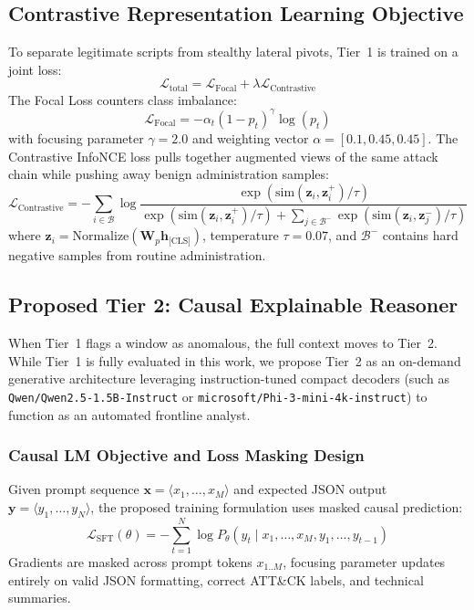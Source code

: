 \documentclass[10pt,journal,compsoc]{IEEEtran}
\begin{document}
\subsection{Contrastive Representation Learning Objective}
To separate legitimate scripts from stealthy lateral pivots, Tier~1 is trained on a joint loss:
\begin{equation}
\mathcal{L}_{\text{total}} = \mathcal{L}_{\text{Focal}} + \lambda \mathcal{L}_{\text{Contrastive}}
\end{equation}
The Focal Loss counters class imbalance:
\begin{equation}
\mathcal{L}_{\text{Focal}} = -\alpha_t (1 - p_t)^\gamma \log(p_t)
\end{equation}
with focusing parameter $\gamma = 2.0$ and weighting vector $\alpha = [0.1, 0.45, 0.45]$. The Contrastive InfoNCE loss pulls together augmented views of the same attack chain while pushing away benign administration samples:
\begin{equation}
\mathcal{L}_{\text{Contrastive}} = -\sum_{i \in \mathcal{B}} \log \frac{\exp\left(\text{sim}(\mathbf{z}_i, \mathbf{z}_i^+) / \tau\right)}{\exp\left(\text{sim}(\mathbf{z}_i, \mathbf{z}_i^+) / \tau\right) + \sum_{j \in \mathcal{B}^-} \exp\left(\text{sim}(\mathbf{z}_i, \mathbf{z}_j^-) / \tau\right)}
\end{equation}
where $\mathbf{z}_i = \text{Normalize}(\mathbf{W}_p \mathbf{h}_{\text{[CLS]}})$, temperature $\tau = 0.07$, and $\mathcal{B}^-$ contains hard negative samples from routine administration.

\subsection{Proposed Tier 2: Causal Explainable Reasoner}
When Tier~1 flags a window as anomalous, the full context moves to Tier~2. While Tier~1 is fully evaluated in this work, we propose Tier~2 as an on-demand generative architecture leveraging instruction-tuned compact decoders (such as \texttt{Qwen/Qwen2.5-1.5B-Instruct} or \texttt{microsoft/Phi-3-mini-4k-instruct}) to function as an automated frontline analyst.

\subsubsection{Causal LM Objective and Loss Masking Design}
Given prompt sequence $\mathbf{x} = \langle x_1, \dots, x_M \rangle$ and expected JSON output $\mathbf{y} = \langle y_1, \dots, y_N \rangle$, the proposed training formulation uses masked causal prediction:
\begin{equation}
\mathcal{L}_{\text{SFT}}(\theta) = -\sum_{t=1}^N \log P_\theta(y_t \mid x_1, \dots, x_M, y_1, \dots, y_{t-1})
\end{equation}
Gradients are masked across prompt tokens $x_{1..M}$, focusing parameter updates entirely on valid JSON formatting, correct ATT\&CK labels, and technical summaries.
\end{document}
